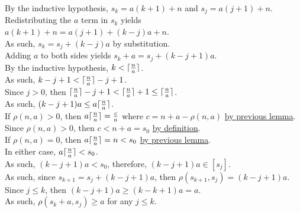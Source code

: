 \documentclass[a4paper,12pt]{article}
\DeclarePairedDelimiter{\ceil}{\lceil}{\rceil}
\begin{document}
\noindent By the inductive hypothesis, $s_k = a(k + 1) + n$ and $s_j = a(j + 1) + n$.\\

\noindent Redistributing the $a$ term in $s_k$ yields $a(k + 1) + n = a(j + 1) + (k - j)a + n$.\\

\noindent As such, $s_k = s_j + (k - j)a$ by substitution.\\

\noindent Adding $a$ to both sides yields $s_k + a = s_j + (k - j + 1)a$.\\

\noindent By the inductive hypothesis, $k < \ceil{\frac{n}{a}}$.\\

\noindent As such, $k - j + 1 < \ceil{\frac{n}{a}} - j + 1$.\\

\noindent Since $j > 0$, then $\ceil{\frac{n}{a}} - j + 1 < \ceil{\frac{n}{a}} + 1 \leq \ceil{\frac{n}{a}}$.\\

\noindent As such, $(k - j + 1)a \leq a\ceil{\frac{n}{a}}$.\\

\noindent If $\rho(n, a) > 0$, then $a\ceil{\frac{n}{a}} = \frac{c}{a}$ where $c = n + a - \rho(n, a)$ \hyperlink{lemma:ceiling_function}{by previous lemma}.\\

\noindent Since $\rho(n, a) > 0$, then $c < n + a = s_0$ \hyperlink{definition:awkward_number_series}{by definition}.\\

\noindent If $\rho(n, a) = 0$, then $a\ceil{\frac{n}{a}} = n < s_0$ \hyperlink{lemma:ceiling_function}{by previous lemma}.\\

\noindent In either case, $a\ceil{\frac{n}{a}} < s_0$.\\

\noindent As such, $(k - j + 1)a < s_0$, therefore, $(k - j + 1)a \in [s_j]$.\\

\noindent As such, since $s_{k + 1} = s_j + (k - j + 1)a$, then $\rho(s_{k + 1}, s_j) = (k - j + 1)a$.\\

\noindent Since $j \leq k$, then $(k - j + 1)a \geq (k - k + 1)a = a$.\\

\noindent As such, $\rho(s_k + a, s_j) \geq a$ for any $j \leq k$.\\
\end{document}

